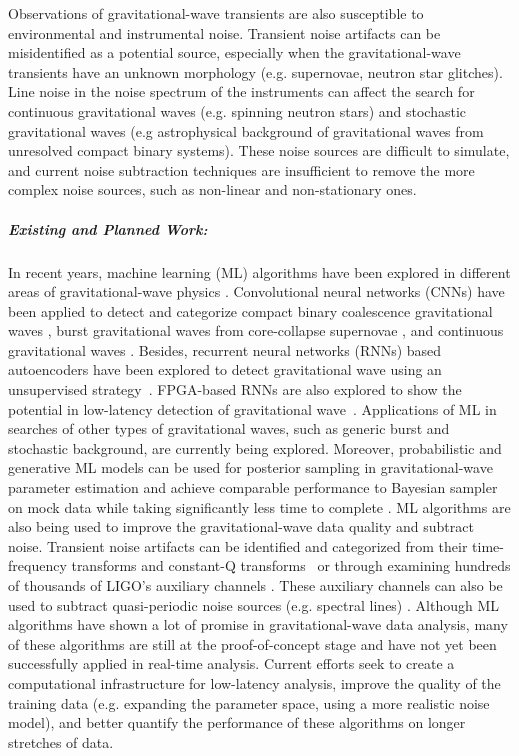         Observations of gravitational-wave transients are also susceptible to environmental and instrumental noise.
        Transient noise artifacts can be misidentified as a potential source, especially when the gravitational-wave transients have an unknown morphology (e.g. supernovae, neutron star glitches).
        Line noise in the noise spectrum of the instruments can affect the search for  continuous gravitational waves (e.g. spinning neutron stars) and stochastic gravitational waves (e.g astrophysical background of gravitational waves from unresolved compact binary systems).
        These noise sources are difficult to simulate, and current noise subtraction techniques are insufficient to remove the more complex noise sources, such as non-linear and non-stationary ones. 

\subparagraph*{Existing and Planned Work:}
        In recent years, machine learning (ML) algorithms have been explored in different areas of gravitational-wave physics \cite{Cuoco_2020}.
        Convolutional neural networks (CNNs) have been applied to detect and categorize compact binary coalescence gravitational waves \cite{PhysRevLett.120.141103, Kim_2015, PhysRevD.101.083006, George_2018, Gebhard_2019}, burst gravitational waves from core-collapse supernovae \cite{Astone_2018, Chan_2020, Iess_2020}, and continuous gravitational waves \cite{Dreissigacker_2019, Beheshtipour_2020}.
        Besides, recurrent neural networks (RNNs) based autoencoders have been explored to detect gravitational wave using an unsupervised strategy~\cite{moreno2021source}. FPGA-based RNNs are also explored to show the potential in low-latency detection of gravitational wave~\cite{que2021accelerating}.
        Applications of ML in searches of other types of gravitational waves, such as generic burst and stochastic background, are currently being explored.
        Moreover, probabilistic and generative ML models can be used for posterior sampling in gravitational-wave parameter estimation and achieve comparable performance to Bayesian sampler on mock data while taking significantly less time to complete \cite{shen2019deterministic, gabbard2020bayesian,  PhysRevLett.124.041102}.
        ML algorithms are also being used to improve the gravitational-wave data quality and subtract noise.
        Transient noise artifacts can be identified and categorized from their time-frequency transforms and constant-Q transforms~\cite{Zevin_2017, Razzano_2018} or through examining hundreds of thousands of LIGO's auxiliary channels \cite{iDQ2013}.
        These auxiliary channels can also be used to subtract quasi-periodic noise sources (e.g. spectral lines) \cite{PhysRevD.101.042003, Ormiston_2020}.
        Although ML algorithms have shown a lot of promise in gravitational-wave data analysis, many of these algorithms are still at the proof-of-concept stage and have not yet been successfully applied in real-time analysis.
        Current efforts seek to create a computational infrastructure for low-latency analysis, improve the quality of the training data (e.g. expanding the parameter space, using a more realistic noise model), and better quantify the performance of these algorithms on longer stretches of data.

